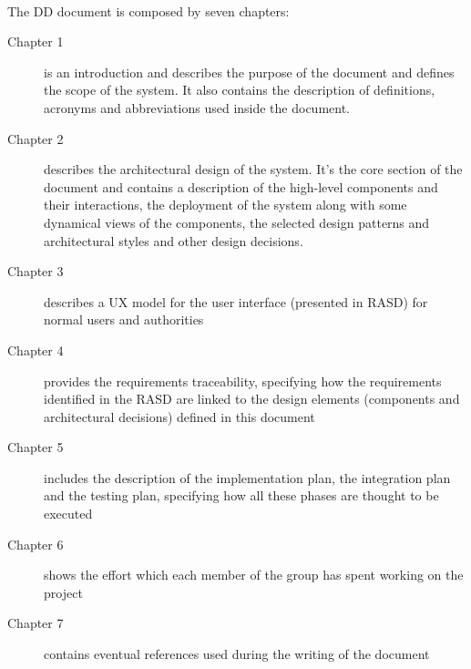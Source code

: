 			\paragraph{}
				The DD document is composed by seven chapters:
			\begin{description}
				\item[Chapter 1]is an introduction and describes the purpose of the document and defines the scope of the system. It also contains the description of definitions, acronyms and abbreviations used inside the document.
				\item[Chapter 2] describes the architectural design of the system. It's the core section of the document and contains a description of the high-level components and their interactions, the deployment of the system along with some dynamical views of the components, the selected design patterns and architectural styles and other design decisions.
				\item[Chapter 3] describes a UX model for the user interface (presented in RASD) for normal users and authorities
				\item[Chapter 4]provides the requirements traceability, specifying how the requirements identified in the RASD are linked to the design elements (components and architectural decisions) defined in this document
				\item[Chapter 5] includes the description of the implementation plan, the integration plan and the testing	plan, specifying how all these phases are thought to be executed
				\item[Chapter 6] shows the effort which each member of the group has spent working on the project
				\item[Chapter 7] contains eventual references used during the writing of the document
			\end{description}